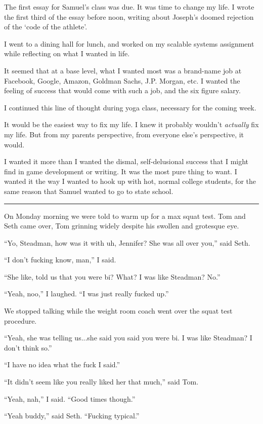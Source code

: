 The first essay for Samuel's class was due.  It was time to change my life.  I
wrote the first third of the essay before noon, writing about Joseph's doomed
rejection of the `code of the athlete'.

I went to a dining hall for lunch, and worked on my scalable systems assignment
while reflecting on what I wanted in life.

It seemed that at a base level, what I wanted most was a brand-name job at
Facebook, Google, Amazon, Goldman Sachs, J.P.  Morgan, etc.  I wanted the
feeling of success that would come with such a job, and the six figure salary.

I continued this line of thought during yoga class, necessary for the coming
week.

It would be the easiest way to fix my life.  I knew it probably wouldn't
\textit{actually} fix my life.  But from my parents perspective, from everyone
else's perspective, it would.  

I wanted it more than I wanted the dismal, self-delusional success that I might
find in game development or writing.  It was the most pure thing to want. I
wanted it the way I wanted to hook up with hot, normal college students, for the
same reason that Samuel wanted to go to state school. 

\plainfancybreak{12pt}{2}{* * *}

On Monday morning we were told to warm up for a max squat test.  Tom and Seth
came over, Tom grinning widely despite his swollen and grotesque eye.

``Yo, Steadman, how was it with uh, Jennifer?  She was all over you,'' said
Seth.

``I don't fucking know, man,'' I said.

``She like, told us that you were bi?  What?  I was like Steadman?  No.''

``Yeah, noo,'' I laughed. ``I was just really fucked up.''

We stopped talking while the weight room coach went over the squat test
procedure. 

``Yeah, she was telling us...she said you said you were bi.  I was like
Steadman?  I don't think so.''

``I have no idea what the fuck I said.''

``It didn't seem like you really liked her that much,'' said Tom.

``Yeah, nah,'' I said.  ``Good times though.''

``Yeah buddy,'' said Seth.  ``Fucking typical.'' 

